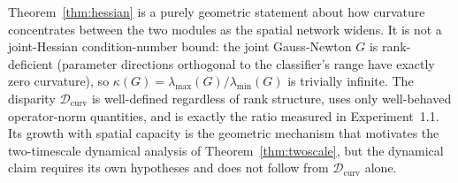 \begin{remark}
\label{rem:disparity_vs_kappa}
Theorem~\ref{thm:hessian} is a purely geometric statement about how
curvature concentrates between the two modules as the spatial network
widens. It is not a joint-Hessian condition-number bound: the joint
Gauss-Newton $G$ is rank-deficient (parameter directions orthogonal
to the classifier's range have exactly zero curvature), so
$\kappa(G) = \lambda_{\max}(G)/\lambda_{\min}(G)$ is trivially
infinite. The disparity $\mathcal{D}_{\mathrm{curv}}$ is
well-defined regardless of rank structure, uses only well-behaved
operator-norm quantities, and is exactly the ratio measured in
Experiment~1.1. Its growth with spatial capacity is the geometric
mechanism that motivates the two-timescale dynamical analysis of
Theorem~\ref{thm:twoscale}, but the dynamical claim requires its own
hypotheses and does not follow from $\mathcal{D}_{\mathrm{curv}}$
alone.
\end{remark}
